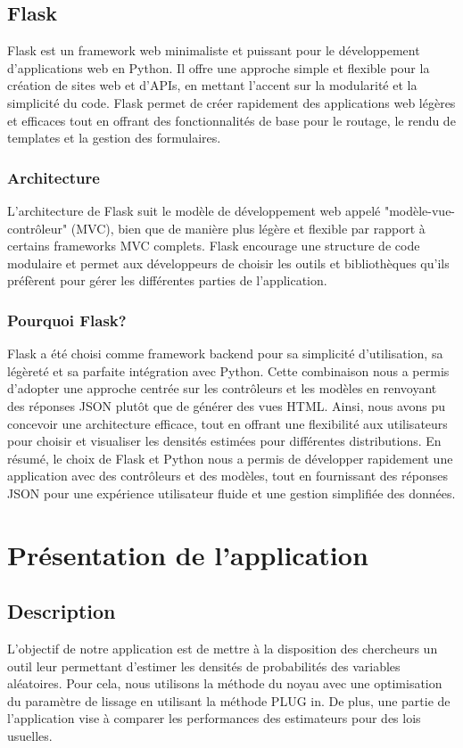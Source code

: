 \subsection{Flask}
Flask est un framework web minimaliste et puissant pour le développement d'applications web en Python. Il offre une approche simple et flexible pour la création de sites web et d'APIs, en mettant l'accent sur la modularité et la simplicité du code. Flask permet de créer rapidement des applications web légères et efficaces tout en offrant des fonctionnalités de base pour le routage, le rendu de templates et la gestion des formulaires.

\subsubsection{Architecture}
L'architecture de Flask suit le modèle de développement web appelé "modèle-vue-contrôleur" (MVC), bien que de manière plus légère et flexible par rapport à certains frameworks MVC complets. Flask encourage une structure de code modulaire et permet aux développeurs de choisir les outils et bibliothèques qu'ils préfèrent pour gérer les différentes parties de l'application.

\subsubsection{Pourquoi Flask?}
Flask a été choisi comme framework backend pour sa simplicité d'utilisation, sa légèreté et sa parfaite intégration avec Python. Cette combinaison nous a permis d'adopter une approche centrée sur les contrôleurs et les modèles en renvoyant des réponses JSON plutôt que de générer des vues HTML. Ainsi, nous avons pu concevoir une architecture efficace, tout en offrant une flexibilité aux utilisateurs pour choisir et visualiser les densités estimées pour différentes distributions. En résumé, le choix de Flask et Python nous a permis de développer rapidement une application avec des contrôleurs et des modèles, tout en fournissant des réponses JSON pour une expérience utilisateur fluide et une gestion simplifiée des données.




\section{Présentation de l'application}
\subsection{Description}
L'objectif de notre application est de mettre à la disposition des chercheurs un outil leur permettant d'estimer les densités de probabilités des variables aléatoires. Pour cela, nous utilisons la méthode du noyau avec une optimisation du paramètre de lissage en utilisant la méthode PLUG in. De plus, une partie de l'application vise à comparer les performances des estimateurs pour des lois usuelles.

